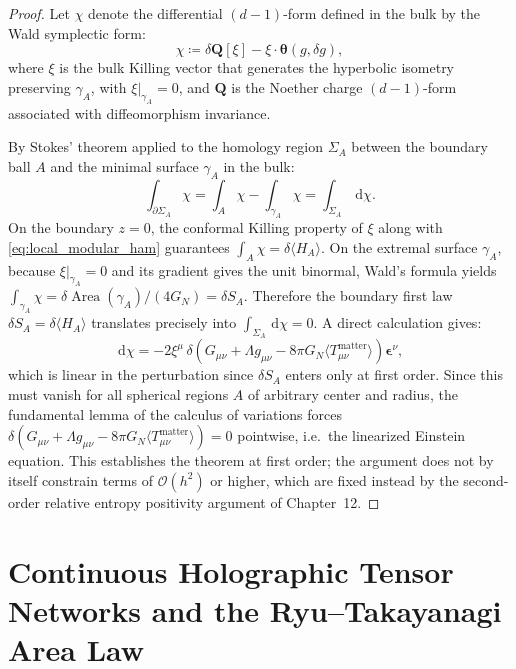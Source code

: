 \documentclass[11pt,a4paper,reqno]{amsart}
\theoremstyle{definition}
\numberwithin{equation}{section}
\providecommand{\Area}{\operatorname{Area}}
\newcommand{\dif}{\,\mathrm{d}}
\begin{document}
\begin{proof}
Let $\chi$ denote the differential $(d-1)$-form defined in the bulk by the Wald symplectic form:
\begin{equation}
    \chi \coloneqq \delta \mathbf{Q}[\xi] - \xi \cdot \mathbf{\theta}(g, \delta g),
\end{equation}
where $\xi$ is the bulk Killing vector that generates the hyperbolic isometry preserving $\gamma_A$, with $\xi|_{\gamma_A} = 0$, and $\mathbf{Q}$ is the Noether charge $(d-1)$-form associated with diffeomorphism invariance.

By Stokes' theorem applied to the homology region $\Sigma_A$ between the boundary ball $A$ and the minimal surface $\gamma_A$ in the bulk:
\begin{equation}
    \int_{\partial \Sigma_A} \chi = \int_A \chi - \int_{\gamma_A} \chi = \int_{\Sigma_A} \dif \chi.
\end{equation}
On the boundary $z = 0$, the conformal Killing property of $\xi$ along with \eqref{eq:local_modular_ham} guarantees $\int_A \chi = \delta \langle H_A \rangle$. On the extremal surface $\gamma_A$, because $\xi|_{\gamma_A} = 0$ and its gradient gives the unit binormal, Wald's formula yields $\int_{\gamma_A} \chi = \delta \Area(\gamma_A)/(4 G_N) = \delta S_A$. Therefore the boundary first law $\delta S_A = \delta \langle H_A \rangle$ translates precisely into $\int_{\Sigma_A} \dif \chi = 0$. A direct calculation gives:
\begin{equation}
    \dif \chi = -2 \xi^\mu\, \delta\!\left( G_{\mu\nu} + \Lambda g_{\mu\nu} - 8\pi G_N \langle T_{\mu\nu}^{\mathrm{matter}} \rangle \right) \mathbf{\epsilon}^\nu,
\end{equation}
which is linear in the perturbation since $\delta S_A$ enters only at first order. Since this must vanish for all spherical regions $A$ of arbitrary center and radius, the fundamental lemma of the calculus of variations forces $\delta(G_{\mu\nu} + \Lambda g_{\mu\nu} - 8\pi G_N \langle T_{\mu\nu}^{\mathrm{matter}}\rangle) = 0$ pointwise, i.e.\ the linearized Einstein equation. This establishes the theorem at first order; the argument does not by itself constrain terms of $\mathcal{O}(h^2)$ or higher, which are fixed instead by the second-order relative entropy positivity argument of Chapter~12.
\end{proof}

\section{Continuous Holographic Tensor Networks and the Ryu--Takayanagi Area Law}
\label{sec:ryu_takayanagi}
\end{document}
